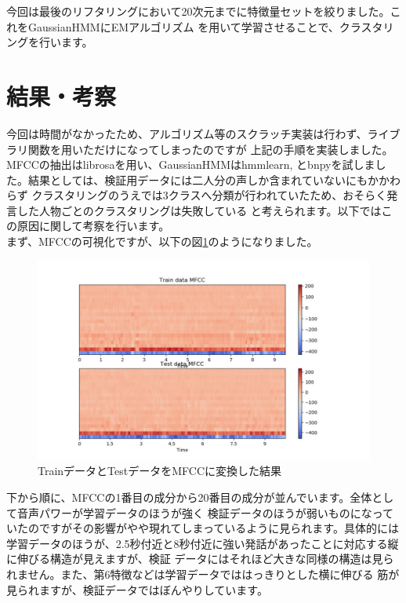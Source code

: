 \documentclass[10pt,a4paper]{ltjsarticle}       %
\begin{document}
今回は最後のリフタリングにおいて20次元までに特徴量セットを絞りました。これをGaussianHMMにEMアルゴリズム
を用いて学習させることで、クラスタリングを行います。
\section{結果・考察}
今回は時間がなかったため、アルゴリズム等のスクラッチ実装は行わず、ライブラリ関数を用いただけになってしまったのですが
上記の手順を実装しました。MFCCの抽出はlibrosa\cite{librosa}を用い、GaussianHMMはhmmlearn\cite{hmmlearn},
とbnpy\cite{bnpy}を試しました。結果としては、検証用データには二人分の声しか含まれていないにもかかわらず
クラスタリングのうえでは3クラスへ分類が行われていたため、おそらく発言した人物ごとのクラスタリングは失敗している
と考えられます。以下ではこの原因に関して考察を行います。\\

まず、MFCCの可視化ですが、以下の図\ref{fig:mfcc}のようになりました。
\begin{figure}[htbp]
  \begin{center}
    \includegraphics[clip, scale=0.6]{mfcc-eps-converted-to}
    \caption{TrainデータとTestデータをMFCCに変換した結果}
    \label{fig:mfcc}
  \end{center}
\end{figure}
下から順に、MFCCの1番目の成分から20番目の成分が並んでいます。全体として音声パワーが学習データのほうが強く
検証データのほうが弱いものになっていたのですがその影響がやや現れてしまっているように見られます。具体的には
学習データのほうが、2.5秒付近と8秒付近に強い発話があったことに対応する縦に伸びる構造が見えますが、検証
データにはそれほど大きな同様の構造は見られません。また、第6特徴などは学習データでははっきりとした横に伸びる
筋が見られますが、検証データではぼんやりしています。\\
\end{document}
